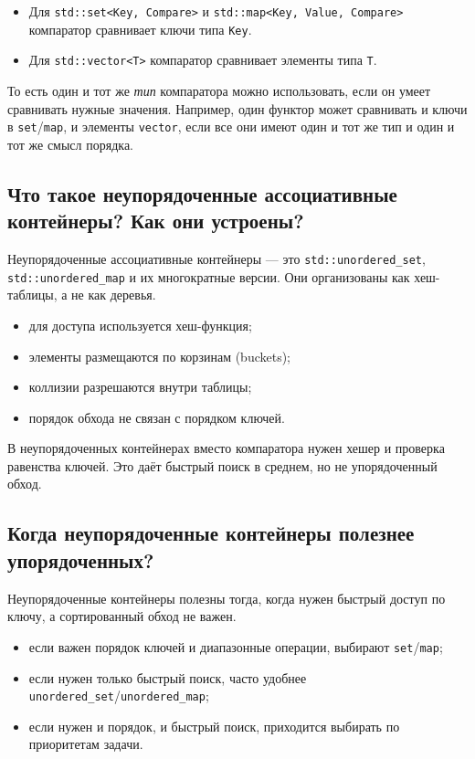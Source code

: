 \begin{itemize}
    \item Для \texttt{std::set<Key, Compare>} и \texttt{std::map<Key, Value, Compare>} компаратор сравнивает ключи типа \texttt{Key}.
    \item Для \texttt{std::vector<T>} компаратор сравнивает элементы типа \texttt{T}.
\end{itemize}

То есть один и тот же \emph{тип} компаратора можно использовать, если он умеет сравнивать нужные значения. Например, один функтор может сравнивать и ключи в \texttt{set}/\texttt{map}, и элементы \texttt{vector}, если все они имеют один и тот же тип и один и тот же смысл порядка.

\subsection{Что такое неупорядоченные ассоциативные контейнеры? Как они устроены?}
Неупорядоченные ассоциативные контейнеры — это \texttt{std::unordered\_set}, \texttt{std::unordered\_map} и их многократные версии. Они организованы как хеш-таблицы, а не как деревья.

\begin{itemize}
    \item для доступа используется хеш-функция;
    \item элементы размещаются по корзинам (buckets);
    \item коллизии разрешаются внутри таблицы;
    \item порядок обхода не связан с порядком ключей.
\end{itemize}

\begin{remark}
В неупорядоченных контейнерах вместо компаратора нужен хешер и проверка равенства ключей. Это даёт быстрый поиск в среднем, но не упорядоченный обход.
\end{remark}

\subsection{Когда неупорядоченные контейнеры полезнее упорядоченных?}
Неупорядоченные контейнеры полезны тогда, когда нужен быстрый доступ по ключу, а сортированный обход не важен.

\begin{itemize}
    \item если важен порядок ключей и диапазонные операции, выбирают \texttt{set}/\texttt{map};
    \item если нужен только быстрый поиск, часто удобнее \texttt{unordered\_set}/\texttt{unordered\_map};
    \item если нужен и порядок, и быстрый поиск, приходится выбирать по приоритетам задачи.
\end{itemize}
